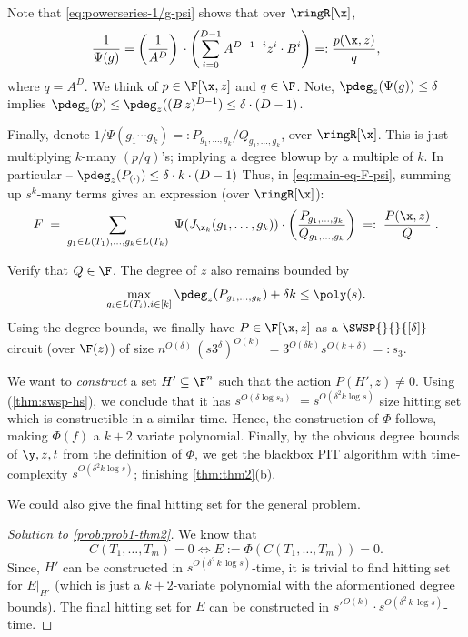 Note that \autoref{eq:powerseries-1/g-psi} shows that over $\ringR[\x]$,  \[\frac{1}{\Psi(g)} =\left( \frac{1}{A^D} \right)\,\cdot \left(\sum_{i=0}^{D-1} A^{D-1-i}z^{i} \cdot B^i\right) =: \frac{p(\x,z)}{q},\] where $q= A^{D}$. We think of $p \in \F[\x,z]$ and $q \in \F$. 
%
Note, $\pdeg_{z}(\Psi(g)) \le \delta$ implies $\pdeg_{z}(p) \le \pdeg_{z}((B\,z)^{D-1}) \le \delta \cdot (D-1)$. 
%

Finally, denote $1/\Psi(g_1 \cdots g_k)=: P_{g_1,\hdots,g_k}/Q_{g_1,\hdots,g_k}$, over $\ringR[\x]$. This is just multiplying $k$-many $(p/q)$'s; implying a degree blowup by a multiple of $k$. In particular -- $\pdeg_{z}(P_{(\cdot)}) \le \delta \cdot k \cdot (D-1)$
%
%
%
%
%
%
Thus, in \autoref{eq:main-eq-F-psi}, summing up $s^k$-many terms gives an expression (over $\ringR[\x]$):
\[ F \;=\; \sum_{g_1 \in L(T_1),\hdots, g_k \in L(T_k)}\; \Psi(J_{\x_k}(g_1,\hdots,g_k)) \cdot \left( \frac{P_{g_1,\hdots,g_k}}{Q_{g_1,\hdots,g_k}} \right)\;=:\; \frac{P(\x,z)}{Q}\;.\]

Verify that $Q \in \F$.
%
%
The degree of $z$ also remains bounded by \[\max_{g_i \in L(T_i), i\in[k]} \pdeg_{z}(P_{g_1,\hdots,g_k})+\delta k \le \poly(s).\]
%
Using the degree bounds, we finally have $P \in \F[\x,z]$ as a $\SWSP{}{}{[\delta]}$-circuit (over $\F(z)$) of size $n^{O(\delta)}\,(s3^{\delta})^{O(k)}$ $=3^{O(\delta k)} s^{O(k+\delta)} =: s_3$. 

We want to \emph{construct} a set $H' \subseteq \F^n$ such that the action $P(H',z) \ne 0$.  Using \cite{forbes2015deterministic} (\autoref{thm:swsp-hs}), we conclude that it has $s^{O(\delta\log s_3)}$ $= s^{O(\delta^2 k \log s)}$ size hitting set which is constructible in a similar time. 
Hence, the construction of $\Phi$ follows, making $\Phi(f)$ a $k+2$ variate polynomial. Finally, by the obvious degree bounds of $\y,z,t$ from the definition of $\Phi$, we get the blackbox PIT algorithm with time-complexity $s^{O(\delta^2 k \log s)}$; finishing \autoref{thm:thm2}(b).

We could also give the final hitting set for the general problem.

\begin{proof}[Solution to \autoref{prob:prob1-thm2}]
We know that \[C(T_1,\hdots,T_m) = 0 \iff E:= \Phi(C(T_1,\hdots,T_m)) =0.\] 
 Since, $H'$ can be constructed in $s^{O(\delta^2\,k\,\log s)}$-time, it is trivial to find hitting set for $E\rvert_{H'}$ (which is just a $k+2$-variate polynomial with the aformentioned degree bounds). The final hitting set for $E$ can be constructed in $s'^{O(k)} \cdot s^{O(\delta^2\,k\,\log s)}$-time.
\end{proof}

